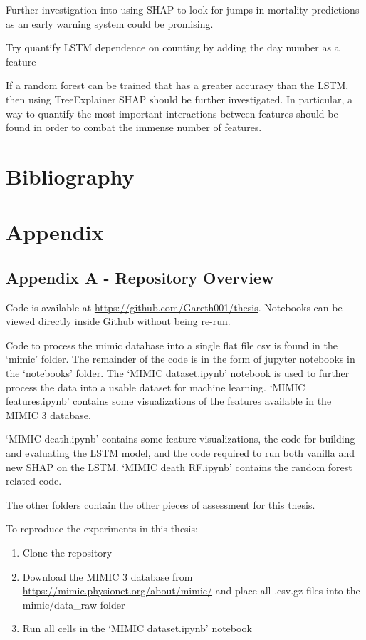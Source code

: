 \documentclass[12pt]{article}
\begin{document}
Further investigation into using SHAP to look for jumps in mortality predictions as an early warning system could be promising. 


Try quantify LSTM dependence on counting by adding the day number as a feature

If a random forest can be trained that has a greater accuracy than the LSTM, then using TreeExplainer SHAP should be further investigated. In particular, a way to quantify the most important interactions between features should be found in order to combat the immense number of features.

\section{Bibliography}

\section{Appendix}

\subsection{Appendix A - Repository Overview}

Code is available at \url{https://github.com/Gareth001/thesis}. Notebooks can be viewed directly inside Github without being re-run.

Code to process the mimic database into a single flat file csv is found in the `mimic' folder. The remainder of the code is in the form of jupyter notebooks in the `notebooks' folder. The `MIMIC dataset.ipynb' notebook is used to further process the data into a usable dataset for machine learning. `MIMIC features.ipynb' contains some visualizations of the features available in the MIMIC 3 database.

`MIMIC death.ipynb' contains some feature visualizations, the code for building and evaluating the LSTM model, and the code required to run both vanilla and new SHAP on the LSTM. `MIMIC death RF.ipynb' contains the random forest related code.

The other folders contain the other pieces of assessment for this thesis.

To reproduce the experiments in this thesis:
\begin{enumerate}
\item Clone the repository
\item Download the MIMIC 3 database from \url{https://mimic.physionet.org/about/mimic/} and place all .csv.gz files into the mimic/data\_raw folder
\item Run all cells in the `MIMIC dataset.ipynb' notebook
\end{enumerate}
\end{document}
